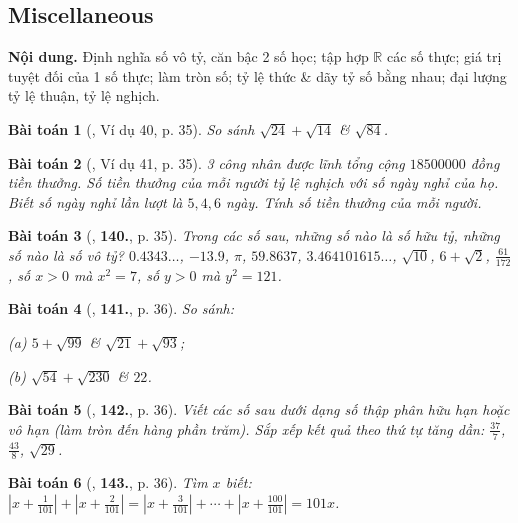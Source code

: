 \documentclass{article}
\numberwithin{equation}{section}
\newtheorem{baitoan}{Bài toán}
\begin{document}

\subsection{Miscellaneous}
\textsf{\textbf{Nội dung.} Định nghĩa số vô tỷ, căn bậc 2 số học; tập hợp $\mathbb{R}$ các số thực; giá trị tuyệt đối của 1 số thực; làm tròn số; tỷ lệ thức \& dãy tỷ số bằng nhau; đại lượng tỷ lệ thuận, tỷ lệ nghịch.}

\begin{baitoan}[\cite{Tuyen_Toan_7}, Ví dụ 40, p. 35]
	So sánh $\sqrt{24} + \sqrt{14}$ \& $\sqrt{84}$.
\end{baitoan}

\begin{baitoan}[\cite{Tuyen_Toan_7}, Ví dụ 41, p. 35]
	3 công nhân được lĩnh tổng cộng $18 500 000$ đồng tiền thưởng. Số tiền thưởng của mỗi người tỷ lệ nghịch với số ngày nghỉ của họ. Biết số ngày nghỉ lần lượt là $5,4,6$ ngày. Tính số tiền thưởng của mỗi người.
\end{baitoan}

\begin{baitoan}[\cite{Tuyen_Toan_7}, \textbf{140.}, p. 35]
	Trong các số sau, những số nào là số hữu tỷ, những số nào là số vô tỷ? $0.4343\ldots$, $-13.9$, $\pi$, $59.8637$, $3.464101615\ldots$, $\sqrt{10}$, $6 + \sqrt{2}$, $\frac{61}{172}$, số $x > 0$ mà $x^2 = 7$, số $y > 0$ mà $y^2 = 121$.
\end{baitoan}

\begin{baitoan}[\cite{Tuyen_Toan_7}, \textbf{141.}, p. 36]
	So sánh:
	\begin{enumerate*}
		\item[(a)] $5 + \sqrt{99}$ \& $\sqrt{21} + \sqrt{93}$;
		\item[(b)] $\sqrt{54} + \sqrt{230}$ \& $22$.
	\end{enumerate*}
\end{baitoan}

\begin{baitoan}[\cite{Tuyen_Toan_7}, \textbf{142.}, p. 36]
	Viết các số sau dưới dạng số thập phân hữu hạn hoặc vô hạn (làm tròn đến hàng phần trăm). Sắp xếp kết quả theo thứ tự tăng dần: $\frac{37}{7}$, $\frac{43}{8}$, $\sqrt{29}$.
\end{baitoan}

\begin{baitoan}[\cite{Tuyen_Toan_7}, \textbf{143.}, p. 36]
	Tìm $x$ biết: $\left|x + \frac{1}{101}\right| + \left|x + \frac{2}{101}\right| = \left|x + \frac{3}{101}\right| + \cdots + \left|x + \frac{100}{101}\right| = 101x$.
\end{baitoan}
\end{document}
